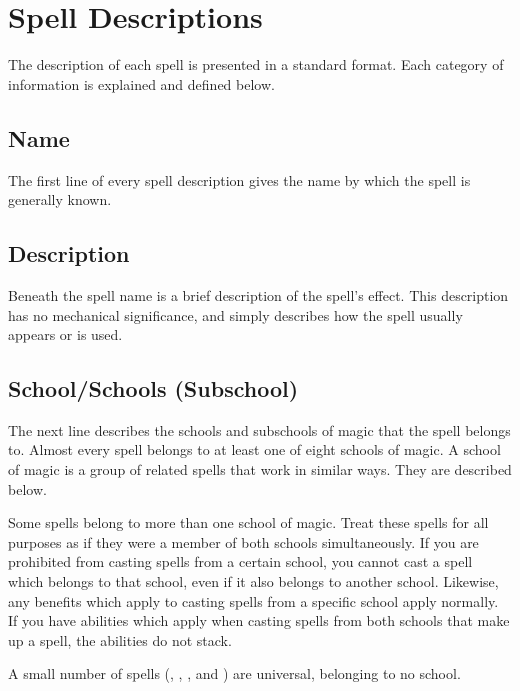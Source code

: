 \section{Spell Descriptions}
The description of each spell is presented in a standard format. Each category of information is explained and defined below.

\subsection{Name}
The first line of every spell description gives the name by which the spell is generally known.

\subsection{Description}
Beneath the spell name is a brief description of the spell's effect. This description has no mechanical significance, and simply describes how the spell usually appears or is used.

\subsection{School/Schools (Subschool)}
The next line describes the schools and subschools of magic that the spell belongs to. Almost every spell belongs to at least one of eight schools of magic. A school of magic is a group of related spells that work in similar ways. They are described below.

Some spells belong to more than one school of magic. Treat these spells for all purposes as if they were a member of both schools simultaneously. If you are prohibited from casting spells from a certain school, you cannot cast a spell which belongs to that school, even if it also belongs to another school. Likewise, any benefits which apply to casting spells from a specific school apply normally. If you have abilities which apply when casting spells from both schools that make up a spell, the abilities do not stack.

A small number of spells (, , , and ) are universal, belonging to no school.

